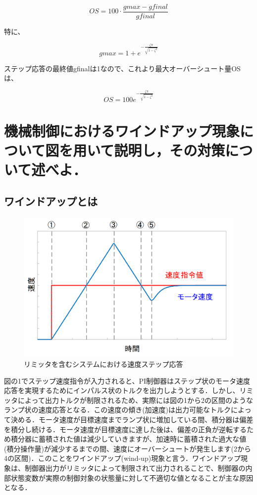 \documentclass[xelatex,ja=standard,jafont=noto]{bxjsarticle}
\numberwithin{figure}{section}
\begin{document}
\begin{equation}
    OS=100\cdot\frac{gmax-gfinal}{gfinal}
\end{equation}

特に、

\begin{equation}
    gmax=1+e^{-\frac{\zeta\pi}{\sqrt{1-\zeta^{2}}}}
\end{equation}

ステップ応答の最終値gfinalは1なので、これより最大オーバーシュート量OSは、

\begin{equation}
    OS=100e^{-\frac{\zeta\pi}{\sqrt{1-\zeta^{2}}}}
\end{equation}

\newpage


\section{機械制御におけるワインドアップ現象について図を用いて説明し，その対策について述べよ．}

\subsection{ワインドアップとは}

\begin{figure}[h!]
    \centering
    \includegraphics[scale=0.8]{014.png}
    \caption{リミッタを含むシステムにおける速度ステップ応答 }
\end{figure}


図の1でステップ速度指令が入力されると、PI制御器はステップ状のモータ速度応答を実現するためにインパルス状のトルクを出力しようとする．しかし、リミッタによって出力トルクが制限されるため、実際には図の1から2の区間のようなランプ状の速度応答となる．この速度の傾き(加速度)は出力可能なトルクによって決める．モータ速度が目標速度までランプ状に増加している間、積分器は偏差を積分し続ける．モータ速度が目標速度に達した後は、偏差の正負が逆転するため積分器に蓄積された値は減少していきますが、加速時に蓄積された過大な値(積分操作量)が減少するまでの間、速度にオーバーシュートが発生します(2から4の区間)．このことをワインドアップ(wind-up)現象と言う．ワインドアップ現象は、制御器出力がリミッタによって制限されて出力されることで、制御器の内部状態変数が実際の制御対象の状態量に対して不適切な値となることが主な原因となる．
\end{document}

